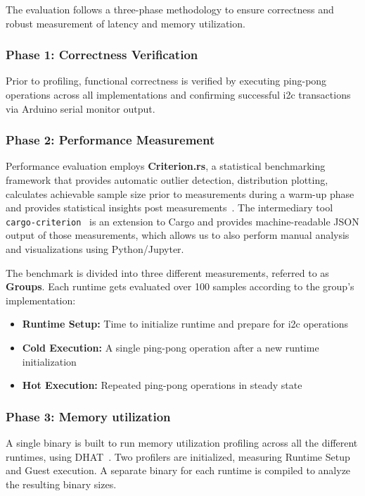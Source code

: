 The evaluation follows a three-phase methodology to ensure correctness and robust measurement of latency and memory utilization.

\subsubsection{Phase 1: Correctness Verification}
Prior to profiling, functional correctness is verified by executing ping-pong operations across all implementations and confirming successful \acrshort{i2c} transactions via Arduino serial monitor output.

\subsubsection{Phase 2: Performance Measurement}
Performance evaluation employs \textbf{Criterion.rs}, a statistical benchmarking framework that provides automatic outlier detection, distribution plotting, calculates achievable sample size prior to measurements during a warm-up phase and provides statistical insights post measurements~\cite{criterion_docs}. The intermediary tool \texttt{cargo-criterion}~\cite{cargo_criterion_docs} is an extension to Cargo and provides machine-readable JSON output of those measurements, which allows us to also perform manual analysis and visualizations using Python/Jupyter.

The benchmark is divided into three different measurements, referred to as \textbf{Groups}. Each runtime gets evaluated over 100 samples according to the group's implementation:
\begin{itemize}
    \item \textbf{Runtime Setup:} Time to initialize runtime and prepare for \acrshort{i2c} operations
    \item \textbf{Cold Execution:} A single ping-pong operation after a new runtime initialization
    \item \textbf{Hot Execution:} Repeated ping-pong operations in steady state
\end{itemize}

\subsubsection{Phase 3: Memory utilization}
A single binary is built to run memory utilization profiling across all the different runtimes, using DHAT~\cite{dhat_crate}. Two profilers are initialized, measuring Runtime Setup and Guest execution. A separate binary for each runtime is compiled to analyze the resulting binary sizes.

